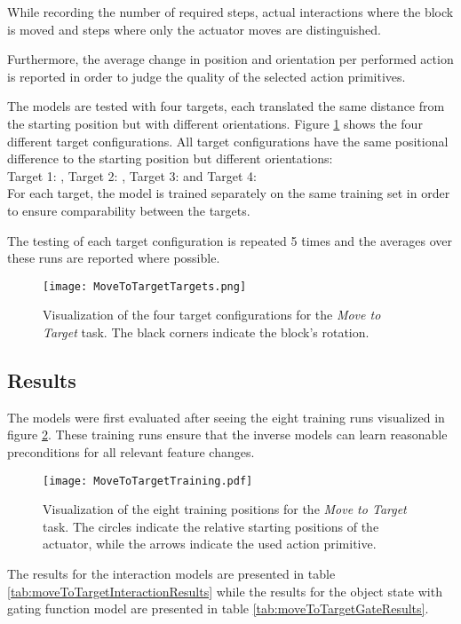 While recording the number of required steps, actual interactions where the block is moved and steps where only the actuator moves are distinguished.

Furthermore, the average change in position and orientation per performed action is reported in order to judge the quality of the selected action primitives.

The models are tested with four targets, each translated the same distance from the starting position but with different orientations. Figure \ref{fig:targetPositions} shows the four different target configurations. All target configurations have the same positional difference to the starting position but different orientations: \\
Target 1: , 
Target 2: , 
Target 3:  and
Target 4:  \\
For each target, the model is trained separately on the same training set in order to ensure comparability between the targets.

The testing of each target configuration is repeated 5 times and the averages over these runs are reported where possible.

\begin{figure}
\centering
\texttt{[image: MoveToTargetTargets.png]}
\caption{Visualization of the four target configurations for the \textit{Move to Target} task. The black corners indicate the block's rotation.}
\label{fig:targetPositions}
\end{figure}

\subsection{Results}
The models were first evaluated after seeing the eight training runs visualized in figure \ref{fig:moveToTargetTraining}. These training runs ensure that the inverse models can learn reasonable preconditions for all relevant feature changes.

\begin{figure}
\centering
\texttt{[image: MoveToTargetTraining.pdf]}
\caption{Visualization of the eight training positions for the \textit{Move to Target} task. The circles indicate the relative starting positions of the actuator, while the arrows indicate the used action primitive.}
\label{fig:moveToTargetTraining}
\end{figure}

The results for the interaction models are presented in table \ref{tab:moveToTargetInteractionResults} while the results for the object state with gating function model are presented in table \ref{tab:moveToTargetGateResults}.

